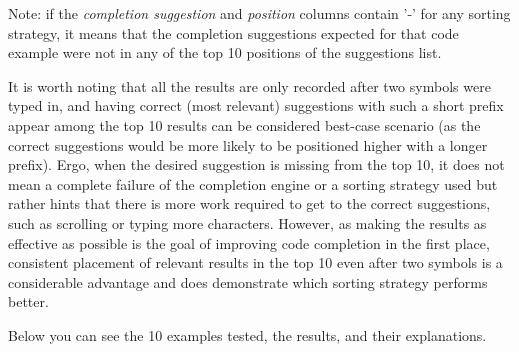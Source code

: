 \documentclass[sigplan,screen]{acmart}
\begin{document}
Note: if the \textit{completion suggestion} and \textit{position} columns contain '-' for any sorting strategy, it means that the completion suggestions expected for that code example were not in any of the top 10 positions of the suggestions list.

It is worth noting that all the results are only recorded after two symbols were typed in, and having correct (most relevant) suggestions with such a short prefix appear among the top 10 results can be considered best-case scenario (as the correct suggestions would be more likely to be positioned higher with a longer prefix). Ergo, when the desired suggestion is missing from the top 10, it does not mean a complete failure of the completion engine or a sorting strategy used but rather hints that there is more work required to get to the correct suggestions, such as scrolling or typing more characters. However, as making the results as effective as possible is the goal of improving code completion in the first place, consistent placement of relevant results in the top 10 even after two symbols is a considerable advantage and does demonstrate which sorting strategy performs better.

Below you can see the 10 examples tested, the results, and their explanations.
\end{document}
